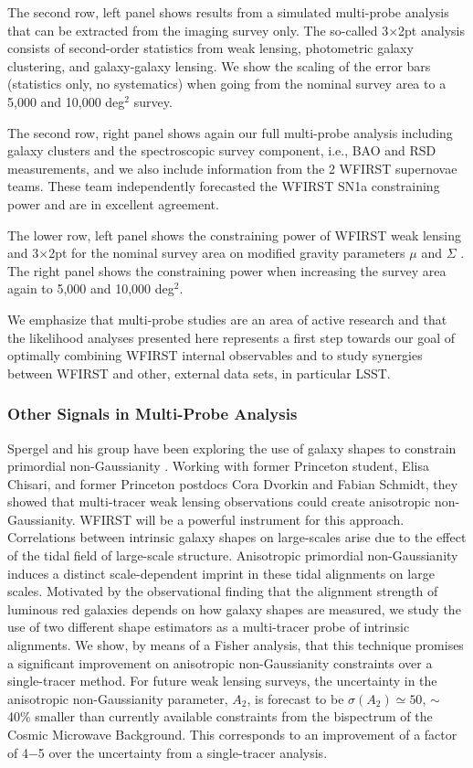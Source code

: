 The second row, left panel shows results from a simulated multi-probe analysis
that can be extracted from the imaging survey only. The so-called 3$\times$2pt analysis
consists of second-order statistics from weak lensing, photometric galaxy
clustering, and galaxy-galaxy lensing. We show the scaling of the error bars
(statistics only, no systematics) when going from the nominal survey area to a
5,000 and 10,000 deg$^2$ survey.

The second row, right panel shows again our full multi-probe analysis including
galaxy clusters and the spectroscopic survey component, i.e., BAO and RSD
measurements, and we also include information from the 2 WFIRST supernovae
teams. These team independently forecasted the WFIRST SN1a constraining power
and are in excellent agreement.

The lower row, left panel shows the constraining power of WFIRST weak lensing
and 3$\times$2pt for the nominal survey area on modified gravity parameters $\mu$ and
$\Sigma$ \citep[see e.g.,][for details]{jjk15, baa15}. The right panel shows the
constraining power when increasing the survey area again to 5,000 and 10,000
deg$^2$.

We emphasize that multi-probe studies are an area of active research and that
the likelihood analyses presented here represents a first step towards our goal of optimally combining WFIRST internal observables and to study synergies between WFIRST and other, external data sets, in particular LSST\@.

\subsubsection{Other Signals in Multi-Probe Analysis} Spergel and his group have been exploring  the use of galaxy shapes to constrain primordial non-Gaussianity \citep{Chisari:2016xki}. Working with former Princeton student, Elisa Chisari, and former Princeton postdocs Cora Dvorkin and Fabian Schmidt, they showed that
multi-tracer weak lensing observations could create anisotropic non-Gaussianity. WFIRST
will be a powerful instrument for this approach.  Correlations between intrinsic
galaxy shapes on large-scales arise due to the effect of the tidal field of
large-scale structure. Anisotropic primordial non-Gaussianity induces a distinct
scale-dependent imprint in these tidal alignments on large scales. Motivated by
the observational finding that the alignment strength of luminous red galaxies
depends on how galaxy shapes are measured, we study the use of two different
shape estimators as a multi-tracer probe of intrinsic alignments. We show, by
means of a Fisher analysis, that this technique promises a significant
improvement on anisotropic non-Gaussianity constraints over a single-tracer
method. For future weak lensing surveys, the uncertainty in the anisotropic
non-Gaussianity parameter, $A_2$, is forecast to be $\sigma(A_2)\simeq 50$, $\sim$ 40\% smaller than
currently available constraints from the bispectrum of the Cosmic Microwave
Background. This corresponds to an improvement of a factor of 4−5 over the
uncertainty from a single-tracer analysis.

